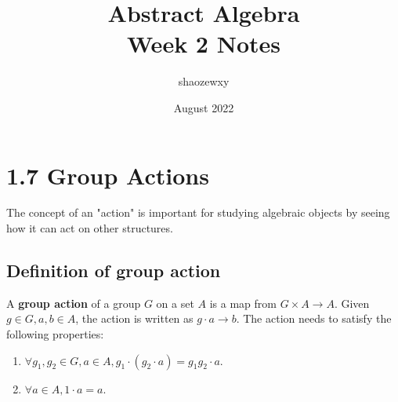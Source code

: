 \documentclass{article}
\title{Abstract Algebra\\
\large{Week 2 Notes}}
\author{shaozewxy }
\date{August 2022}
\begin{document}
\maketitle

\setcounter{secnumdepth}{0}
\section*{1.7 Group Actions}
The concept of an "action" is important for studying algebraic objects by seeing how it can act on other structures.
\subsection*{Definition of group action}
A \textbf{group action} of a group $G$ on a set $A$ is a map from $G \times A \rightarrow A$. Given $g \in G, a, b \in A$, the action is written as $g\cdot a \rightarrow b$. The action needs to satisfy the following properties:
\begin{enumerate}
    \item $\forall g_1, g_2 \in G, a\in A, g_1\cdot(g_2\cdot a) = g_1g_2\cdot a$.
    \item $\forall a \in A, 1\cdot a = a$.
\end{enumerate}
\end{document}
